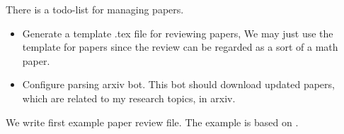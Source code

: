 \documentclass[11pt]{amsart}
\begin{document}
\begin{todo} There is a todo-list for managing papers.
    \begin{itemize}
        \item Generate a template .tex file for reviewing papers,
        We may just use the template for papers since the review can be regarded as a sort of a math paper.
        \item Configure parsing arxiv bot.
        This bot should download updated papers, which are related to my research topics, in arxiv.
    \end{itemize}
\end{todo}

We write first example paper review file.
The example is based on \cite{Goresky_MacPherson-1980-intersection}.



\end{document}
